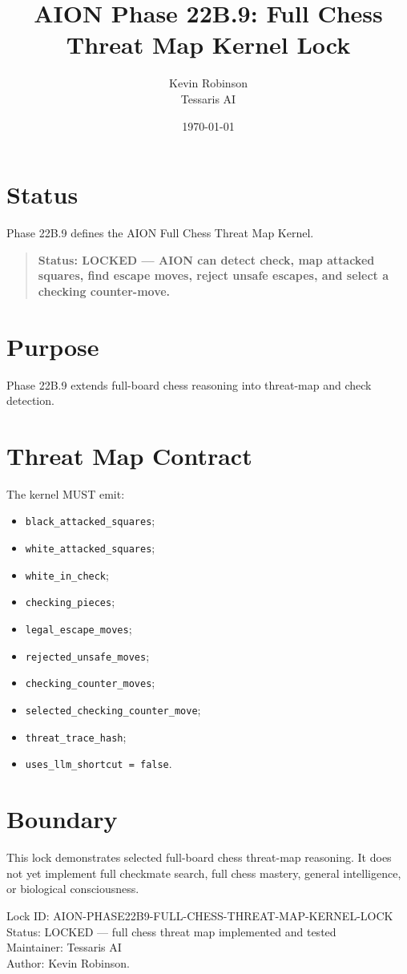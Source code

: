 \documentclass[11pt,a4paper]{article}
\title{\textbf{AION Phase 22B.9: Full Chess Threat Map Kernel Lock}}
\author{Kevin Robinson\\Tessaris AI}
\date{\today}
\begin{document}
\maketitle

\section{Status}

Phase 22B.9 defines the AION Full Chess Threat Map Kernel.

\begin{quote}
\textbf{Status: LOCKED --- AION can detect check, map attacked squares, find escape moves, reject unsafe escapes, and select a checking counter-move.}
\end{quote}

\section{Purpose}

Phase 22B.9 extends full-board chess reasoning into threat-map and check detection.

\section{Threat Map Contract}

The kernel MUST emit:

\begin{itemize}
  \item \texttt{black\_attacked\_squares};
  \item \texttt{white\_attacked\_squares};
  \item \texttt{white\_in\_check};
  \item \texttt{checking\_pieces};
  \item \texttt{legal\_escape\_moves};
  \item \texttt{rejected\_unsafe\_moves};
  \item \texttt{checking\_counter\_moves};
  \item \texttt{selected\_checking\_counter\_move};
  \item \texttt{threat\_trace\_hash};
  \item \texttt{uses\_llm\_shortcut = false}.
\end{itemize}

\section{Boundary}

This lock demonstrates selected full-board chess threat-map reasoning. It does not yet implement full checkmate search, full chess mastery, general intelligence, or biological consciousness.

\bigskip

\noindent
Lock ID: AION-PHASE22B9-FULL-CHESS-THREAT-MAP-KERNEL-LOCK\\
Status: LOCKED --- full chess threat map implemented and tested\\
Maintainer: Tessaris AI\\
Author: Kevin Robinson.
\end{document}
